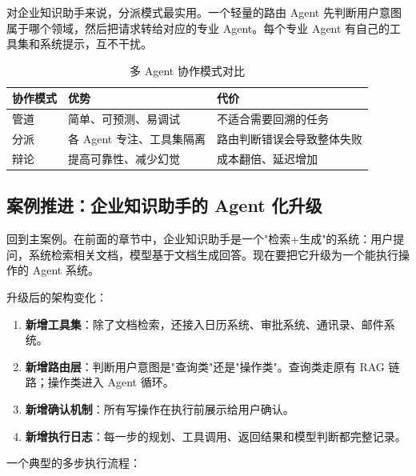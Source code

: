 对企业知识助手来说，分派模式最实用。一个轻量的路由 Agent 先判断用户意图属于哪个领域，然后把请求转给对应的专业 Agent。每个专业 Agent 有自己的工具集和系统提示，互不干扰。

\begin{table}[H]
\centering
\small
\begin{tabularx}{\textwidth}{>{\raggedright\arraybackslash}p{2.5cm}>{\raggedright\arraybackslash}p{3cm}>{\raggedright\arraybackslash}X}
\toprule
\textbf{协作模式} & \textbf{优势} & \textbf{代价} \\
\midrule
管道 & 简单、可预测、易调试 & 不适合需要回溯的任务 \\
分派 & 各 Agent 专注、工具集隔离 & 路由判断错误会导致整体失败 \\
辩论 & 提高可靠性、减少幻觉 & 成本翻倍、延迟增加 \\
\bottomrule
\end{tabularx}
\caption{多 Agent 协作模式对比}
\label{tab:multi-agent-patterns}
\end{table}

\subsection{案例推进：企业知识助手的 Agent 化升级}
回到主案例。在前面的章节中，企业知识助手是一个"检索+生成"的系统：用户提问，系统检索相关文档，模型基于文档生成回答。现在要把它升级为一个能执行操作的 Agent 系统。

升级后的架构变化：

\begin{enumerate}
  \item \textbf{新增工具集}：除了文档检索，还接入日历系统、审批系统、通讯录、邮件系统。
  \item \textbf{新增路由层}：判断用户意图是"查询类"还是"操作类"。查询类走原有 RAG 链路；操作类进入 Agent 循环。
  \item \textbf{新增确认机制}：所有写操作在执行前展示给用户确认。
  \item \textbf{新增执行日志}：每一步的规划、工具调用、返回结果和模型判断都完整记录。
\end{enumerate}

一个典型的多步执行流程：

